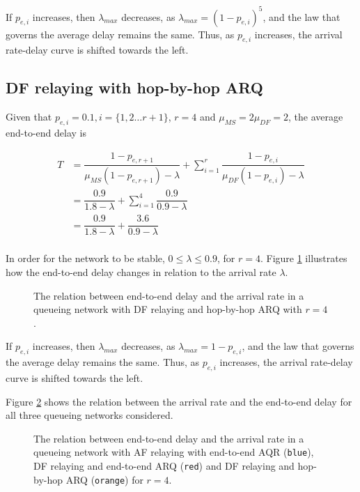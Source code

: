 If $p_{e,i}$ increases, then $\lambda_{max}$ decreases, as
$\lambda_{max} = (1-p_{e,i})^5$, and the law that governs the average
delay remains the same. Thus, as $p_{e,i}$ increases, the arrival rate-delay
curve is shifted towards the left.


\subsection{DF relaying with hop-by-hop ARQ}

Given that $p_{e,i} = 0.1, i = \{1,2 \dots r+1\}$, $r=4$ and
$\mu_{MS} = 2\mu_{DF} = 2$, the average end-to-end delay is

\begin{align*}
  T &= \dfrac{1 - p_{e,r+1}}{\mu_{MS}(1 - p_{e,r+1}) - \lambda} + \sum\limits_{i=1}^r \dfrac{1-p_{e,i}}{\mu_{DF} (1 - p_{e,i}) - \lambda} \\
  ~ &= \dfrac{0.9}{1.8 - \lambda} + \sum\limits_{i=1}^4 \dfrac{0.9}{0.9 - \lambda} \\
  ~ &= \dfrac{0.9}{1.8 - \lambda} + \dfrac{3.6}{0.9 - \lambda} \\
\end{align*}

In order for the network to be stable,
$0 \leq \lambda \leq 0.9$, for $r=4$. Figure
\ref{fig:05_arrival_rate_df_hbh} illustrates how the end-to-end delay changes in
relation to the arrival rate $\lambda$.

\begin{figure}\centering
  
  \caption{The relation between end-to-end delay and the arrival rate in a
    queueing network with DF relaying and hop-by-hop ARQ with $r=4$.}
  \label{fig:05_arrival_rate_df_hbh}
\end{figure}

If $p_{e,i}$ increases, then $\lambda_{max}$ decreases, as
$\lambda_{max} = 1-p_{e,i}$, and the law that governs the average
delay remains the same. Thus, as $p_{e,i}$ increases, the arrival rate-delay
curve is shifted towards the left.


Figure \ref{fig:05_arrival_rates} shows the relation between the arrival rate
and the end-to-end delay for all three queueing networks considered.

\begin{figure}[H]\centering
  
  \caption{The relation between end-to-end delay and the arrival rate in a
    queueing network with AF relaying with end-to-end AQR (\texttt{blue}),
    DF relaying and end-to-end ARQ (\texttt{red}) and
    DF relaying and hop-by-hop ARQ (\texttt{orange}) for $r=4$.}
  \label{fig:05_arrival_rates}
\end{figure}
